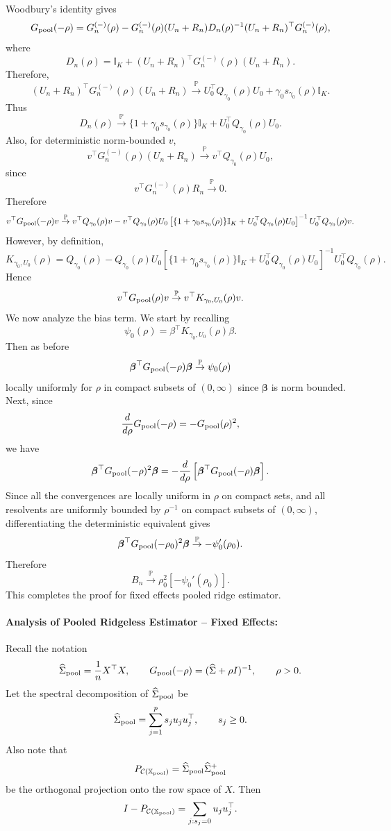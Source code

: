 \documentclass{article}
\theoremstyle{plain}
\theoremstyle{remark}
\def \bbeta{\boldsymbol{\beta}}
\def \bbeta{\boldsymbol{\beta}}
\def \Xm {\mathbb{X}_{\rm pool}}
\def \I{\mathcal{I}}
\def \P{\mathbb{P}}
\def \I {\mathbb{I}}
\begin{document}
Woodbury's identity gives
\[
G_{\rm pool}(-\rho)
=
G_n^{(-)}(\rho)
-
G_n^{(-)}(\rho)(U_n+R_n)
D_n(\rho)^{-1}
(U_n+R_n)^\top G_n^{(-)}(\rho),
\]
where
\[
D_n(\rho)
=
\I_K+(U_n+R_n)^\top G_n^{(-)}(\rho)(U_n+R_n).
\]
Therefore, \[
(U_n+R_n)^\top G_n^{(-)}(\rho)(U_n+R_n)
\stackrel{\P}{\to}
U_0^\top Q_{\gamma_0}(\rho)U_0
+
\gamma_0s_{\gamma_0}(\rho)\I_K.
\]
Thus
\[
D_n(\rho)
\stackrel{\P}{\to}
\{1+\gamma_0s_{\gamma_0}(\rho)\}\I_K
+
U_0^\top Q_{\gamma_0}(\rho)U_0.
\]
Also, for deterministic norm-bounded \(v\),
\[
v^\top G_n^{(-)}(\rho)(U_n+R_n)
\stackrel{\P}{\to}
v^\top Q_{\gamma_0}(\rho)U_0,
\]
since
\[
v^\top G_n^{(-)}(\rho)R_n\stackrel{\P}{\to}0.
\]
Therefore
\[
v^\top G_{\rm pool}(-\rho)v
\stackrel{\P}{\to}
v^\top Q_{\gamma_0}(\rho)v
-
v^\top Q_{\gamma_0}(\rho)U_0
\left[
\{1+\gamma_0s_{\gamma_0}(\rho)\}\I_K
+
U_0^\top Q_{\gamma_0}(\rho)U_0
\right]^{-1}
U_0^\top Q_{\gamma_0}(\rho)v.
\]
However, by definition,
\[
K_{\gamma_0,U_0}(\rho)
=
Q_{\gamma_0}(\rho)
-
Q_{\gamma_0}(\rho)U_0
\left[
\{1+\gamma_0s_{\gamma_0}(\rho)\}\I_K
+
U_0^\top Q_{\gamma_0}(\rho)U_0
\right]^{-1}
U_0^\top Q_{\gamma_0}(\rho).
\]
Hence
\[
v^\top G_{\rm pool}(\rho)v
\stackrel{\P}{\to}
v^\top K_{\gamma_0,U_0}(\rho)v.
\]
We now analyze the bias term. We start by recalling
\[
\psi_0(\rho)=\beta^\top K_{\gamma_0,U_0}(\rho)\beta.
\]
Then as before
\[
\bbeta^\top G_{\rm pool}(-\rho)\bbeta
\stackrel{\P}{\to}
\psi_0(\rho)
\]
locally uniformly for \(\rho\) in compact subsets of \((0,\infty)\) since $\bbeta$ is norm bounded. Next, since
\[
\frac{d}{d\rho}G_{\rm pool}(-\rho)
=
-G_{\rm pool}(\rho)^2,
\]
we have
\[
\bbeta^\top G_{\rm pool}(-\rho)^2\bbeta
=
-\frac{d}{d\rho}
\left[
\bbeta^\top G_{\rm pool}(-\rho)\bbeta
\right].
\]
Since all the convergences are locally uniform in $\rho$ on compact sets, and all resolvents are uniformly bounded by \(\rho^{-1}\) on compact subsets of \((0,\infty)\), differentiating the deterministic equivalent gives
\[
\bbeta^\top G_{\rm pool}(-\rho_0)^2\bbeta
\stackrel{\P}{\to}
-\psi_0'(\rho_0).
\]
Therefore
\[
B_n
\stackrel{\P}{\to}
\rho_0^2[-\psi_0'(\rho_0)].
\]
This completes the proof for fixed effects pooled ridge estimator.

\paragraph{Analysis of Pooled Ridgeless Estimator -- Fixed Effects:}
Recall the notation
\[
\widehat\Sigma_{\rm pool}=\frac1nX^\top X,
\qquad
G_{\rm pool}(-\rho)=(\widehat\Sigma+\rho I)^{-1},
\qquad
\rho>0.
\]
Let the spectral decomposition of \(\widehat\Sigma_{\rm pool}\) be
\[
\widehat\Sigma_{\rm pool}
=
\sum_{j=1}^p s_j u_ju_j^\top,
\qquad
s_j\ge 0.
\]
Also note that
\[
P_{\mathcal{C}(\Xm)}=\widehat\Sigma_{\rm pool}\widehat\Sigma_{\rm pool}^+
\]
be the orthogonal projection onto the row space of \(X\). Then
\[
I-P_{\mathcal{C}(\Xm)}
=
\sum_{j:s_j=0}u_ju_j^\top.
\]
\end{document}
